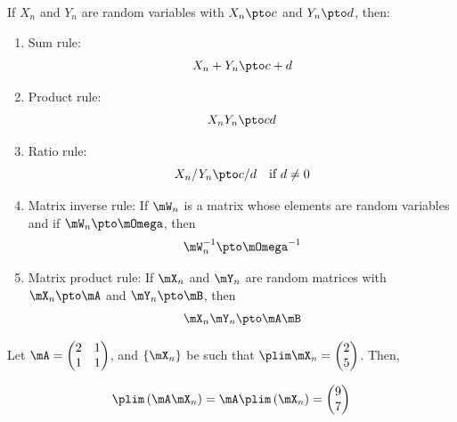 \documentclass[english,12pt]{book}\usepackage[]{graphicx}\usepackage[]{xcolor}
\begin{document}
\begin{theorem}\label{teo:rules_pto}
  If $X_n$ and $Y_n$ are random variables with $X_n \pto c$ and $Y_n\pto d$, then:
  
  \begin{enumerate}
    \item Sum rule:
        \begin{equation}
            X_n + Y_n \pto c + d
        \end{equation}
    \item Product rule:
        \begin{equation}
            X_nY_n \pto cd
        \end{equation}
    \item Ratio rule:
        \begin{equation}
            X_n/Y_n \pto c/d \quad \mbox{if $d\neq 0$}
        \end{equation}
    \item Matrix inverse rule: If $\mW_n$ is a matrix whose elements are random variables and if $\mW_n\pto \mOmega$, then
        \begin{equation}
          \mW_n^{-1}\pto \mOmega^{-1}
        \end{equation}
    \item Matrix product rule: If $\mX_n$ and $\mY_n$ are random matrices with $\mX_n\pto \mA$ and $\mY_n\pto \mB$, then
        \begin{equation}
          \mX_n\mY_n\pto \mA\mB
        \end{equation}
  \end{enumerate}
\end{theorem}

\begin{example}
Let $\mA = \begin{pmatrix} 2 & 1 \\ 1 & 1 \end{pmatrix}$, and $\left\lbrace \mX_n \right\rbrace$ be such that $\plim \mX_n = \begin{pmatrix} 2 \\ 5 \end{pmatrix}$. Then, 

\begin{equation*}
  \plim\left(\mA\mX_n\right) = \mA\plim\left(\mX_n\right) = \begin{pmatrix} 9 \\ 7 \end{pmatrix}
\end{equation*}
\end{example}
\end{document}
